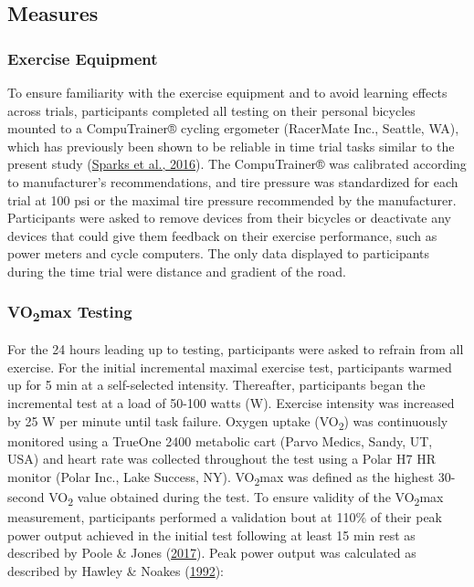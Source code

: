 \documentclass[]{cik}%
\begin{document}
\hypertarget{measures}{%
\subsection{Measures}\label{measures}}

\hypertarget{exercise-equipment}{%
\subsubsection{Exercise Equipment}\label{exercise-equipment}}

To ensure familiarity with the exercise equipment and to avoid learning
effects across trials, participants completed all testing on their
personal bicycles mounted to a CompuTrainer® cycling ergometer
(RacerMate Inc., Seattle, WA), which has previously been shown to be
reliable in time trial tasks similar to the present study
(\protect\hyperlink{ref-42}{Sparks et al., 2016}). The CompuTrainer® was
calibrated according to manufacturer's recommendations, and tire
pressure was standardized for each trial at 100 psi or the maximal tire
pressure recommended by the manufacturer. Participants were asked to
remove devices from their bicycles or deactivate any devices that could
give them feedback on their exercise performance, such as power meters
and cycle computers. The only data displayed to participants during the
time trial were distance and gradient of the road.

\hypertarget{vo2max-testing}{%
\subsubsection{\texorpdfstring{VO\textsubscript{2}max
Testing}{VO2max Testing}}\label{vo2max-testing}}

For the 24 hours leading up to testing, participants were asked to
refrain from all exercise. For the initial incremental maximal exercise
test, participants warmed up for 5 min at a self-selected intensity.
Thereafter, participants began the incremental test at a load of 50-100
watts (W). Exercise intensity was increased by 25 W per minute until
task failure. Oxygen uptake (VO\textsubscript{2}) was continuously
monitored using a TrueOne 2400 metabolic cart (Parvo Medics, Sandy, UT,
USA) and heart rate was collected throughout the test using a Polar H7
HR monitor (Polar Inc., Lake Success, NY). VO\textsubscript{2}max was
defined as the highest 30-second VO\textsubscript{2} value obtained
during the test. To ensure validity of the VO\textsubscript{2}max
measurement, participants performed a validation bout at 110\% of their
peak power output achieved in the initial test following at least 15 min
rest as described by Poole \& Jones
(\protect\hyperlink{ref-poole2017measurement}{2017}). Peak power output
was calculated as described by Hawley \& Noakes
(\protect\hyperlink{ref-hawley1992}{1992}):
\end{document}

